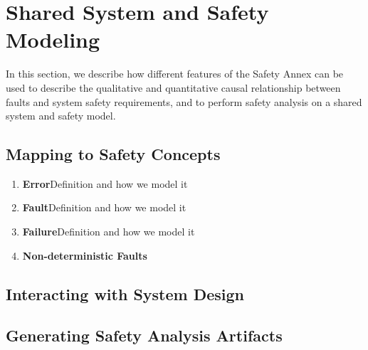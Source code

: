 \section{Shared System and Safety Modeling}
\label{sec:safety_modeling}

In this section, we describe how different features of the Safety Annex can be used to describe the qualitative and quantitative causal relationship between faults and system safety requirements, and to perform safety analysis on a shared system and safety model.

\subsection{Mapping to Safety Concepts}

\begin{enumerate}
	\item \textbf{Error}Definition and how we model it
	\item \textbf{Fault}Definition and how we model it
	\item \textbf{Failure}Definition and how we model it
	\item \textbf{Non-deterministic Faults}
\end{enumerate}

\begin{comment}
Errors/Faults/Failures - to a safety engineer, these terms have very specific meanings.  You will see my specific comments on this topic where I located them by your Section 3.3.  If needed, we can talk about this comment after I send you my mark-ups.
In Section 3.1, you introduce the term "non-deterministic".  I am not sure how your new process can be used by the safety engineering discipline unless things are "deterministic" and therefore "repeatable".
\end{comment}

\subsection{Interacting with System Design}

\begin{comment}
This paper should define how your team of authors see the interaction between "functions" and "system".  
Here is how I see the interaction / relationship:
(a) Aircraft Functions are the highest level
(b) Aircraft Functions are comprised of one or more System
(c) Each System performs one or more System Function
(d) Each System is comprised of one or more LRUs (a.k.a. "items")
\end{comment}

\subsection{Generating Safety Analysis Artifacts}